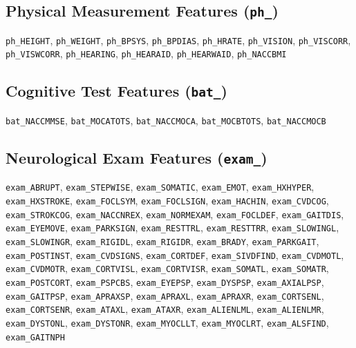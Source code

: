 \documentclass[11pt,a4paper]{article}
\begin{document}
\subsection{Physical Measurement Features (\texttt{ph\_})}

\begin{small}
\texttt{ph\_HEIGHT}, \texttt{ph\_WEIGHT}, \texttt{ph\_BPSYS}, \texttt{ph\_BPDIAS}, \texttt{ph\_HRATE}, \texttt{ph\_VISION}, \texttt{ph\_VISCORR}, \texttt{ph\_VISWCORR}, \texttt{ph\_HEARING}, \texttt{ph\_HEARAID}, \texttt{ph\_HEARWAID}, \texttt{ph\_NACCBMI}
\end{small}

\subsection{Cognitive Test Features (\texttt{bat\_})}

\begin{small}
\texttt{bat\_NACCMMSE}, \texttt{bat\_MOCATOTS}, \texttt{bat\_NACCMOCA}, \texttt{bat\_MOCBTOTS}, \texttt{bat\_NACCMOCB}
\end{small}

\subsection{Neurological Exam Features (\texttt{exam\_})}

\begin{small}
\texttt{exam\_ABRUPT}, \texttt{exam\_STEPWISE}, \texttt{exam\_SOMATIC}, \texttt{exam\_EMOT}, \texttt{exam\_HXHYPER}, \texttt{exam\_HXSTROKE}, \texttt{exam\_FOCLSYM}, \texttt{exam\_FOCLSIGN}, \texttt{exam\_HACHIN}, \texttt{exam\_CVDCOG}, \texttt{exam\_STROKCOG}, \texttt{exam\_NACCNREX}, \texttt{exam\_NORMEXAM}, \texttt{exam\_FOCLDEF}, \texttt{exam\_GAITDIS}, \texttt{exam\_EYEMOVE}, \texttt{exam\_PARKSIGN}, \texttt{exam\_RESTTRL}, \texttt{exam\_RESTTRR}, \texttt{exam\_SLOWINGL}, \texttt{exam\_SLOWINGR}, \texttt{exam\_RIGIDL}, \texttt{exam\_RIGIDR}, \texttt{exam\_BRADY}, \texttt{exam\_PARKGAIT}, \texttt{exam\_POSTINST}, \texttt{exam\_CVDSIGNS}, \texttt{exam\_CORTDEF}, \texttt{exam\_SIVDFIND}, \texttt{exam\_CVDMOTL}, \texttt{exam\_CVDMOTR}, \texttt{exam\_CORTVISL}, \texttt{exam\_CORTVISR}, \texttt{exam\_SOMATL}, \texttt{exam\_SOMATR}, \texttt{exam\_POSTCORT}, \texttt{exam\_PSPCBS}, \texttt{exam\_EYEPSP}, \texttt{exam\_DYSPSP}, \texttt{exam\_AXIALPSP}, \texttt{exam\_GAITPSP}, \texttt{exam\_APRAXSP}, \texttt{exam\_APRAXL}, \texttt{exam\_APRAXR}, \texttt{exam\_CORTSENL}, \texttt{exam\_CORTSENR}, \texttt{exam\_ATAXL}, \texttt{exam\_ATAXR}, \texttt{exam\_ALIENLML}, \texttt{exam\_ALIENLMR}, \texttt{exam\_DYSTONL}, \texttt{exam\_DYSTONR}, \texttt{exam\_MYOCLLT}, \texttt{exam\_MYOCLRT}, \texttt{exam\_ALSFIND}, \texttt{exam\_GAITNPH}
\end{small}
\end{document}
